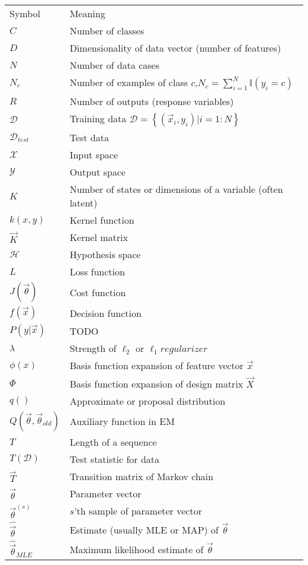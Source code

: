 \begin{longtable}{p{2.4cm}p{8.9cm}}
Symbol & Meaning \\
\noalign{\smallskip}\hline\noalign{\smallskip}
$C$ & Number of classes\\
$D$ & Dimensionality of data vector (number of features)\\
$N$ & Number of data cases\\
$N_c$ & Number of examples of class $c$,$N_c=\sum_{i=1}^{N}\mathbb{I}(y_i=c)$\\
$R$ & Number of outputs (response variables)\\
$\mathcal{D}$ & Training data $\mathcal{D}=\left\{(\vec{x}_i,y_i) | i=1:N\right\}$\\
$\mathcal{D}_{test}$ & Test data\\
$\mathcal{X}$ & Input space\\
$\mathcal{Y}$ & Output space\\
$K$ & Number of states or dimensions of a variable (often latent)\\
$k(x,y)$ & Kernel function\\
$\vec{K}$ & Kernel matrix\\
$\mathcal{H}$ & Hypothesis space\\
$L$ & Loss function \\
$J(\vec{\theta})$ & Cost function\\
$f(\vec{x})$ & Decision function\\
$P(y|\vec{x})$ & TODO\\
$\lambda$ & Strength of $\ell_2$ or $\ell_1 regularizer$\\
$\phi(x)$ & Basis function expansion of feature vector $\vec{x}$\\
$\Phi$ & Basis function expansion of design matrix $\vec{X}$\\
$q()$ & Approximate or proposal distribution\\
$Q(\vec{\theta},\vec{\theta}_{old})$ & Auxiliary function in EM\\
$T$ & Length of a sequence\\
$T(\mathcal{D})$ & Test statistic for data\\
$\vec{T}$ & Transition matrix of Markov chain\\
$\vec{\theta}$ & Parameter vector\\
$\vec{\theta}^{(s)}$ & $s$'th sample of parameter vector\\
$\hat{\vec{\theta}}$ & Estimate (usually MLE or MAP) of $\vec{\theta}$\\
$\hat{\vec{\theta}}_{MLE}$ & Maximum likelihood estimate of $\vec{\theta}$\\

\end{longtable}
